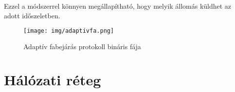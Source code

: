 \documentclass[margin=0px]{article}
\begin{document}
\begin{description}
\begin{description}
\begin{itemize}
\begin{itemize}
                                    Ezzel a módszerrel könnyen megállapítható, hogy melyik állomás küldhet az adott időszeletben.
                                    \begin{figure}[H]
                                        \centering
                                        \texttt{[image: img/adaptivfa.png]}
                                        \caption{Adaptív fabejárás protokoll bináris fája}
                                    \end{figure}
                          \end{itemize}
                \end{itemize}
        \end{description}
\end{description}
\section{Hálózati réteg}
\end{document}
